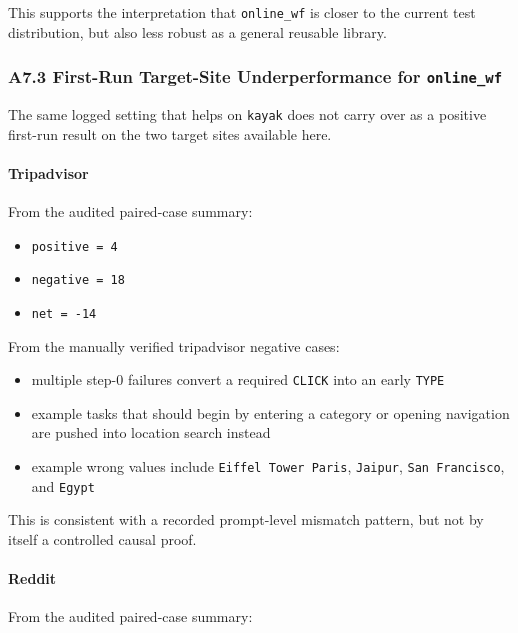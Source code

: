 This supports the interpretation that \texttt{online\_wf} is closer to
the current test distribution, but also less robust as a general
reusable library.

\subsubsection{\texorpdfstring{A7.3 First-Run Target-Site
Underperformance for \texttt{online\_wf}}{A7.3 First-Run Target-Site Underperformance for online\_wf}}

The same logged setting that helps on \texttt{kayak} does not carry over
as a positive first-run result on the two target sites available here.

\paragraph{Tripadvisor}

From the audited paired-case summary:

\begin{itemize}
\tightlist
\item
  \texttt{positive\ =\ 4}
\item
  \texttt{negative\ =\ 18}
\item
  \texttt{net\ =\ -14}
\end{itemize}

From the manually verified tripadvisor negative cases:

\begin{itemize}
\tightlist
\item
  multiple step-0 failures convert a required \texttt{CLICK} into an
  early \texttt{TYPE}
\item
  example tasks that should begin by entering a category or opening
  navigation are pushed into location search instead
\item
  example wrong values include \texttt{Eiffel\ Tower\ Paris},
  \texttt{Jaipur}, \texttt{San\ Francisco}, and \texttt{Egypt}
\end{itemize}

This is consistent with a recorded prompt-level mismatch pattern, but
not by itself a controlled causal proof.

\paragraph{Reddit}

From the audited paired-case summary:


